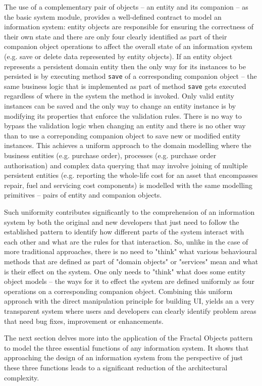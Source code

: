 \documentclass[a4paper,12pt,oneside,openright,final]{memoir} %
\begin{document}
	The use of a complementary pair of objects -- an entity and its companion -- as the basic system module, provides a well-defined contract to model an information system: entity objects are responsible for ensuring the correctness of their own state and there are only four clearly identified as part of their companion object operations to affect the overall state of an information system (e.g. save or delete data represented by entity objects).
	If an entity object represents a persistent domain entity then the only way for its instances to be persisted is by executing method \texttt{save} of a corresponding companion object -- the same business logic that is implemented as part of method \texttt{save} gets executed regardless of where in the system the method is invoked.
	Only valid entity instances can be saved and the only way to change an entity instance is by modifying its properties that enforce the validation rules.
	There is no way to bypass the validation logic when changing an entity and there is no other way than to use a correponding companion object to save new or modified entity instances.
	This achieves a uniform approach to the domain modelling where the business entities (e.g. purchase order), processes (e.g. purchase order authorisation) and complex data querying that may involve joining of multiple persistent entities (e.g. reporting the whole-life cost for an asset that encompasses repair, fuel and servicing cost components) is modelled with the same modelling primitives -- pairs of entity and companion objects.

	Such uniformity contributes significantly to the comprehension of an information system by both the original and new developers that just need to follow the established pattern to identify how different parts of the system interact with each other and what are the rules for that interaction.
	So, unlike in the case of more traditional approaches, there is no need to "think" what various behavioural methods that are defined as part of "domain objects" or "services" mean and what is their effect on the system.
	One only needs to "think" what does some entity object models -- the ways for it to effect the system are defined uniformly as four operations on a corresponding companion object.
	Combining this uniform approach with the direct manipulation principle for building UI, yields an a very transparent system where users and developers can clearly identify problem areas that need bug fixes, improvement or enhancements.
	
	The next section delves more into the application of the Fractal Objects pattern to model the three essential functions of any information system.
	It shows that approaching the design of an information system from the perspective of just these three functions leads to a significant reduction of the architectural complexity.
\end{document}
